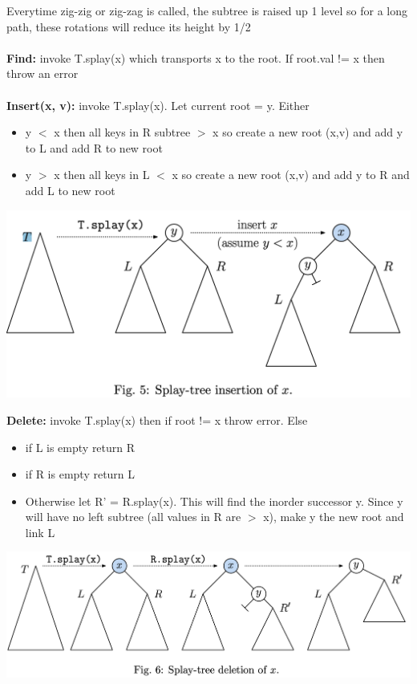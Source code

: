 \documentclass{article}
\begin{document}
  Everytime zig-zig or zig-zag is called, the subtree is raised up 1 level so for a long path, these rotations will reduce its height by 1/2\\ \\
  \textbf{Find: }invoke T.splay(x) which transports x to the root. If root.val != x then throw an error\\ \\
  \textbf{Insert(x, v): }invoke T.splay(x). Let current root = y. Either
  \begin{itemize}[noitemsep]
  \item y $<$ x then all keys in R subtree $>$ x so create a new root (x,v) and add y to L and add R to new root
  \item y $>$ x then all keys in L $<$ x so create a new root (x,v) and add y to R and add L to new root
  \end{itemize}
  \begin{center}
  \includegraphics[scale=0.15]{SplayInsert}
  \end{center}
  \textbf{Delete: }invoke T.splay(x) then if root != x throw error. Else 
  \begin{itemize}[noitemsep]
  \item if L is empty return R
  \item if R is empty return L 
  \item Otherwise let R' = R.splay(x). This will find the inorder successor y. Since y will have no left subtree (all values in R are $>$ x), make y the new root and link L
  \end{itemize}
  \includegraphics[width=\textwidth]{SplayDelete}
  \newpage
\end{document}
